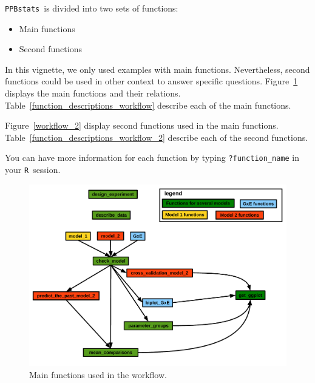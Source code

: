 \documentclass{article}\usepackage[]{graphicx}\usepackage[]{color}
\newcommand{\pack}{\texttt{PPBstats}}
\newcommand{\R}{\texttt{R}}
\begin{document}
\pack~is divided into two sets of functions:

\begin{itemize}
\item Main functions
\item Second functions
\end{itemize}

In this vignette, we only used examples with main functions.
Nevertheless, second functions could be used in other context to answer specific questions.
Figure~\ref{main_workflow} displays the main functions and their relations.
Table~\ref{function_descriptions_workflow} describe each of the main functions.

Figure~\ref{workflow_2} display second functions used in the main functions.
Table~\ref{function_descriptions_workflow_2} describe each of the second functions.

You can have more information for each function by typing \texttt{?function\_name} in your \R~session.



\begin{figure}[H]
\begin{center}
\includegraphics[width=\textwidth,page=1]{PBBstats_function_relations}
\end{center}
\caption{Main functions used in the workflow.}
\label{main_workflow}
\end{figure}
\end{document}

